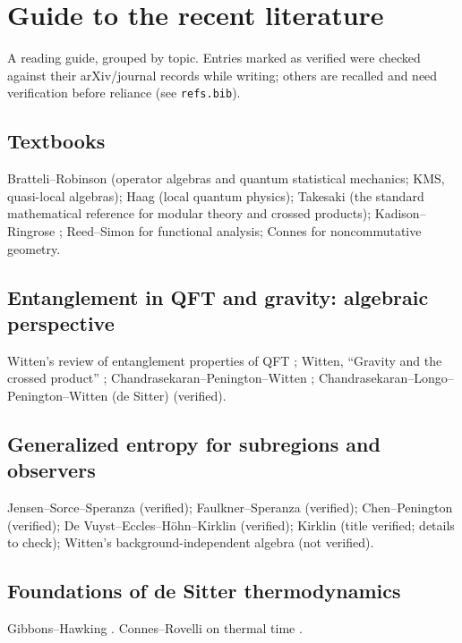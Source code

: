 \chapter{Guide to the recent literature}\label{ch:literature}

\begin{physmotiv}
A reading guide, grouped by topic. Entries marked as verified were checked against their arXiv/journal records while writing; others are recalled and need verification before reliance (see \texttt{refs.bib}).
\end{physmotiv}

\section{Textbooks}
Bratteli--Robinson \cite{BratteliRobinson1,BratteliRobinson2} (operator algebras and quantum statistical mechanics; KMS, quasi-local algebras); Haag \cite{Haag} (local quantum physics); Takesaki \cite{Takesaki1,Takesaki2} (the standard mathematical reference for modular theory and crossed products); Kadison--Ringrose \cite{KadisonRingrose1}; Reed--Simon \cite{ReedSimon1} for functional analysis; Connes \cite{Connes1994} for noncommutative geometry.

\section{Entanglement in QFT and gravity: algebraic perspective}
Witten's review of entanglement properties of QFT \cite{Witten2018}; Witten, ``Gravity and the crossed product'' \cite{Witten2021}; Chandrasekaran--Penington--Witten \cite{CPW2022}; Chandrasekaran--Longo--Penington--Witten (de Sitter) \cite{CLPW2023} (verified).

\section{Generalized entropy for subregions and observers}
Jensen--Sorce--Speranza \cite{JSS2023} (verified); Faulkner--Speranza \cite{FaulknerSperanza2024} (verified); Chen--Penington \cite{ChenPenington2024} (verified); De Vuyst--Eccles--H\"ohn--Kirklin \cite{DEHK2024a,DEHK2024b} (verified); Kirklin \cite{Kirklin2024GSL} (title verified; details to check); Witten's background-independent algebra \cite{Witten2023bg} (not verified).

\section{Foundations of de Sitter thermodynamics}
Gibbons--Hawking \cite{GibbonsHawking1977}. Connes--Rovelli on thermal time \cite{ConnesRovelli1994}.

